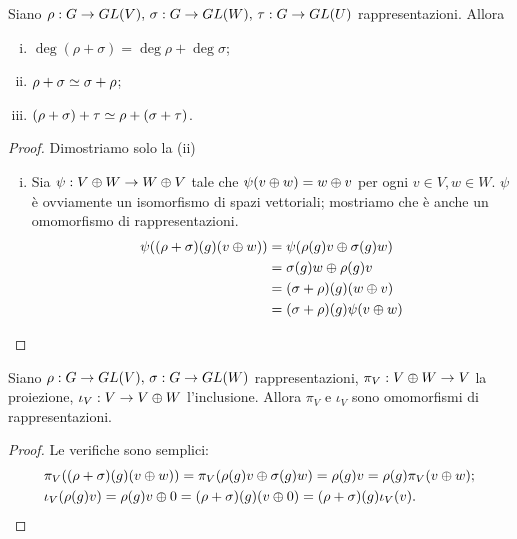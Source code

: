 \begin{proposition}
Siano $\rho:G\to GL(V),\,\allowbreak\sigma:G\to GL(W),\,\allowbreak\tau:G\to GL(U)$ rappresentazioni. Allora
\begin{enumerate}[(i)]
\item $\deg(\rho+\sigma)=\deg\rho+\deg\sigma$;
\item $\rho+\sigma\simeq\sigma+\rho$;
\item $(\rho+\sigma)+\tau\simeq\rho+(\sigma+\tau)$.
\end{enumerate}
\end{proposition}
\begin{proof}
Dimostriamo solo la (ii)
\begin{enumerate}[(i)]
\addtocounter{enumi}{1}
\item Sia $\psi:V\oplus W\to W\oplus V$ tale che $\psi(v\oplus w)=w\oplus v$ per ogni $v\in V\comma w\in W$. $\psi$ è ovviamente un isomorfismo di spazi vettoriali; mostriamo che è anche un omomorfismo di rappresentazioni.
\begin{align*}
\psi((\rho+\sigma)(g)(v\oplus w))&=\psi(\rho(g)v\oplus\sigma(g)w)\\
&=\sigma(g)w\oplus\rho(g)v\\
&=(\sigma+\rho)(g)(w\oplus v)\\
&=(\sigma+\rho)(g)\psi(v\oplus w)
\end{align*}
\end{enumerate}
\end{proof}

\begin{proposition}
Siano $\rho:G\to GL(V),\,\allowbreak\sigma:G\to GL(W)$ rappresentazioni, $\pi_V:V\oplus W\to V$ la proiezione, $\iota_V:V\to V\oplus W$ l'inclusione. Allora $\pi_V$ e $\iota_V$ sono omomorfismi di rappresentazioni.
\end{proposition}
\begin{proof}
Le verifiche sono semplici:
\begin{align*}
&\pi_V((\rho+\sigma)(g)(v\oplus w))=\pi_V(\rho(g)v\oplus\sigma(g)w)=\rho(g)v=\rho(g)\pi_V(v\oplus w);\\
&\iota_V(\rho(g)v)=\rho(g)v\oplus 0=(\rho+\sigma)(g)(v\oplus 0)=(\rho+\sigma)(g)\iota_V(v).\\
\end{align*}
\end{proof}

